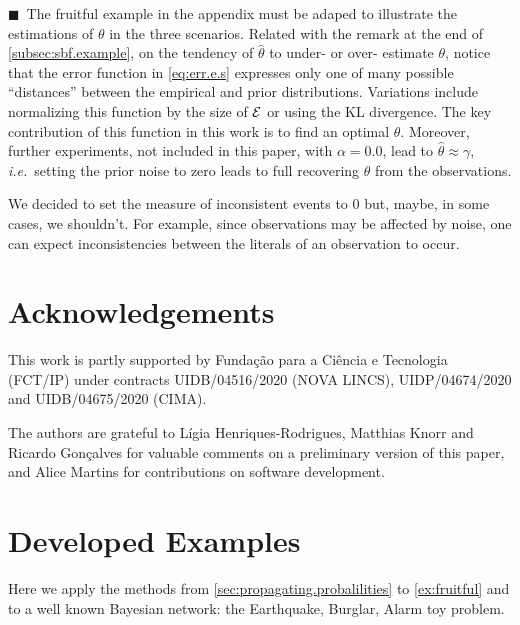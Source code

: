 \documentclass{tlp}
\newcommand{\cla}[1]{\ensuremath{{\cal #1}}}        %
\newcommand{\EVENTSset}{\ensuremath{\cla{E}}}
\newcommand{\LOOK}{\ensuremath{\blacksquare}}
\newcommand{\franc}[1]{{\color{green!30!black}#1}}
\begin{document}
\franc{\LOOK~The fruitful example in the appendix must be adaped to
  illustrate the estimations of \(\theta\) in the three scenarios.}
Related with the remark at the end of \cref{subsec:sbf.example}, on
the tendency of \(\hat{\theta}\) to under- or over- estimate
\(\theta\), notice that the error function in \eqref{eq:err.e.s}
expresses only one of many possible ``distances'' between the
empirical and prior distributions.  Variations include normalizing
this function by the size of \(\EVENTSset\) or using the \acl{KL}
divergence.  The key contribution of this function in this work is to
find an optimal \(\theta\).  Moreover, further experiments, not
included in this paper, with \(\alpha = 0.0\), lead to
\(\hat{\theta} \approx \gamma\), \emph{i.e.}\ setting the prior noise
to zero leads to full recovering \(\theta\) from the observations.

We decided to set the measure of inconsistent events to \(0\) but,
maybe, in some cases, we shouldn't.  For example, since observations
may be affected by noise, one can expect inconsistencies between the
literals of an observation to occur.
%
%
%
\section*{Acknowledgements}
%
%
%
This work is partly supported by Funda\c{c}\~ao para a Ci\^{e}ncia e
Tecnologia (FCT/IP) under contracts UIDB/04516/2020 (NOVA LINCS),
UIDP/04674/2020 and UIDB/04675/2020 (CIMA).

The authors are grateful to Lígia Henriques-Rodrigues, Matthias Knorr
and Ricardo Gonçalves for valuable comments on a preliminary version
of this paper, and Alice Martins for contributions on software
development.


\ifLNCS  \fi
\ifTLP%
  \ifTLPBIB
    
  \else
    
  \fi
\fi




\newpage

\appendix

\section{Developed Examples}
\label{sec:developed.examples}

Here we apply the methods from \cref{sec:propagating.probalilities} to
\cref{ex:fruitful} and to a well known Bayesian network: the
Earthquake, Burglar, Alarm toy problem.
\end{document}

